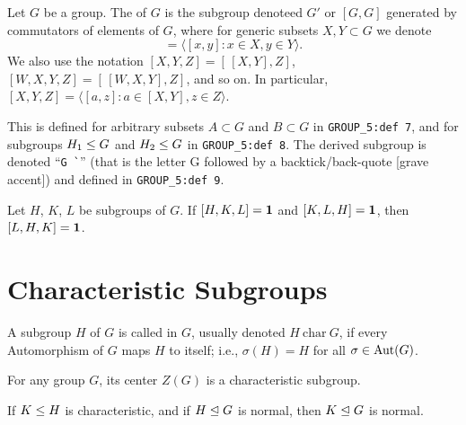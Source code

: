 \begin{definition}\index{$[G,G]$}
Let $G$ be a group. The  of $G$ is the subgroup
denoteed $G'$ or $[G,G]$ generated by commutators of elements of $G$, where
for generic subsets $X,Y\subset G$ we denote
\begin{equation}
  [X,Y] = \langle [x,y] : x\in X,y\in Y\rangle.
\end{equation}
We also use the notation $[X,Y,Z] = [\,{[X,Y]},Z]$, $[W,X,Y,Z] = [\,{[W,X,Y]},Z]$,
and so on. In particular, $[X,Y,Z] = \langle [a,z] : a\in[X,Y], z\in Z\rangle$.
\end{definition}

\begin{remark}
This is defined for arbitrary subsets $A\subset G$ and $B\subset G$ in
\verb#GROUP_5:def 7#, and for subgroups $H_{1}\leq G$ and
$H_{2}\leq G$ in \verb#GROUP_5:def 8#. The derived subgroup is
denoted ``\verb#G `#'' (that is the letter G followed by a
backtick/back-quote [grave accent]) and defined in \verb#GROUP_5:def 9#.
\end{remark}


\begin{theorem}
  Let $H$, $K$, $L$ be subgroups of $G$.
  If $[H,K,L]=\mathbf{1}$ and $[K,L,H]=\mathbf{1}$,
  then $[L,H,K]=\mathbf{1}$.
\end{theorem}

\section{Characteristic Subgroups}

\begin{definition}
A subgroup $H$ of $G$ is called  in $G$, usually
denoted $H~\mathrm{char}~G$, if every Automorphism of $G$ maps $H$ to
itself; i.e., $\sigma(H)=H$ for all $\sigma\in\operatorname{Aut}(G)$.
\end{definition}

\begin{theorem}
For any group $G$, its center $Z(G)$ is a characteristic subgroup.
\end{theorem}

\begin{theorem}
If $K\leq H$ is characteristic, and if $H\trianglelefteq G$ is normal,
then $K\trianglelefteq G$ is normal.
\end{theorem}

